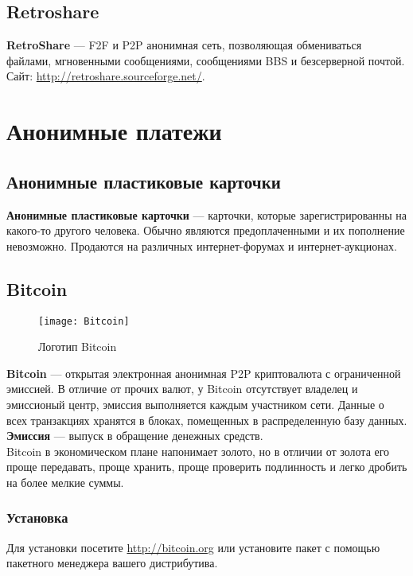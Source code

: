 \subsection{Retroshare}
\textbf{RetroShare} --- F2F и P2P анонимная сеть, позволяющая обмениваться файлами, мгновенными сообщениями, сообщениями BBS и безсерверной почтой. Сайт: \url{http://retroshare.sourceforge.net/}.

\section{Анонимные платежи}
\subsection{Анонимные пластиковые карточки}
\textbf{Анонимные пластиковые карточки} --- карточки, которые зарегистрированны на какого-то другого человека. Обычно являются предоплаченными и их пополнение невозможно. Продаются на различных интернет-форумах и интернет-аукционах.
\subsection{Bitcoin}
\begin{wrapfigure}[6]{r}{0.25\linewidth}
\texttt{[image: Bitcoin]}
\caption{Логотип Bitcoin}
\end{wrapfigure}
\textbf{Bitcoin} --- открытая электронная анонимная P2P криптовалюта с ограниченной эмиссией. В отличие от прочих валют, у Bitcoin отсутствует владелец и эмиссионый центр, эмиссия выполняется каждым участником сети. Данные о всех транзакциях хранятся в блоках, помещенных в распределенную базу данных.\\
\textbf{Эмиссия} --- выпуск в обращение денежных средств.\\
Bitcoin в экономическом плане напонимает золото, но в отличии от золота его проще передавать, проще хранить, проще проверить подлинность и легко дробить на более мелкие суммы.
\subsubsection{Установка}
Для установки посетите \url{http://bitcoin.org} или установите пакет с помощью пакетного менеджера вашего дистрибутива.
